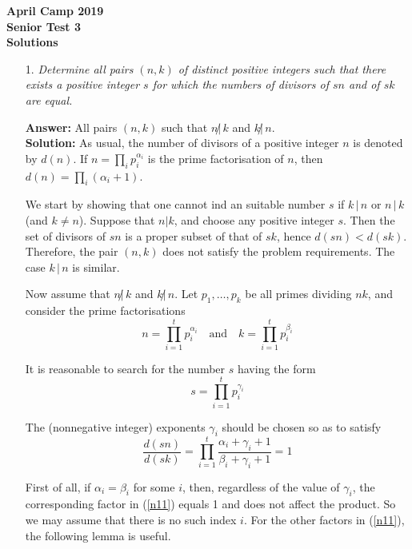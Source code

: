 \documentclass[a4paper, 12pt]{article}
\begin{document}
\begin{center}
\textbf{April Camp 2019 \\ Senior Test 3} \\
\textbf{Solutions}
\end{center}
\vspace{5mm}

\begin{enumerate}

\item[1.]  \textit{ Determine all pairs $(n, k)$ of distinct positive integers such that there exists a positive integer $s$ for which the numbers of divisors of $sn$ and of $sk$ are equal.
}
\vspace{5mm}

\textbf{Answer:} All pairs $(n, k)$ such that $n \not |\, k$ and $k \not |\, n$. \\

\textbf{Solution:}  As usual, the number of divisors of a positive integer $n$ is denoted by $d(n)$. If $n = \prod_i p_i^{\alpha_i}$ is the prime factorisation of $n$, then $d(n) = \prod_i(\alpha_i + 1)$.

We start by showing that one cannot ind an suitable number $s$ if $k \,|\, n$ or $n \,|\, k$ (and $k \not = n$). Suppose that $n | k$, and choose any positive integer $s$. Then the set of divisors of $sn$ is a proper subset of that of $sk$, hence $d(sn) < d(sk)$. Therefore, the pair $(n, k)$ does not satisfy the problem requirements. The case $k \,|\, n$ is similar.

Now assume that $n \not |\, k$ and $k \not |\, n$. Let $p_1, \dots, p_k$ be all primes dividing $nk$, and consider the prime factorisations
$$
n = \prod_{i=1}^t p_i^{\alpha_i} \quad \textrm{and} \quad 
k = \prod_{i=1}^t p_i^{\beta_i}
$$

It is reasonable to search for the number $s$ having the form
$$
s = \prod_{i=1}^t p_i^{\gamma_i}
$$

The (nonnegative integer) exponents $\gamma_i$ should be chosen so as to satisfy
\begin{equation} \label{n11}
    \frac{d(sn)}{d(sk)} = \prod_{i=1}^t  \frac{\alpha_i + \gamma_i + 1}{\beta_i + \gamma_i + 1} = 1    
\end{equation}

First of all, if $\alpha_i = \beta_i$ for some $i$, then, regardless of the value of $\gamma_i$, the corresponding factor in (\ref{n11}) equals 1 and does not affect the product. So we may assume that there is no such index $i$. For the other factors in (\ref{n11}), the following lemma is useful.


\end{enumerate}
\end{document}
